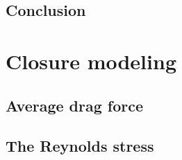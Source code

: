 \documentclass[12pt,a4paper,openany]{My_book}
\begin{document}
\label{sec:results}





% 

\section{Conclusion}



\chapter{Closure modeling}
\label{chap:mono-disperse}
\localtableofcontents


\section{Average drag force}



\section{The Reynolds stress}


% 
% 
% 
% 
% 

\end{document}
